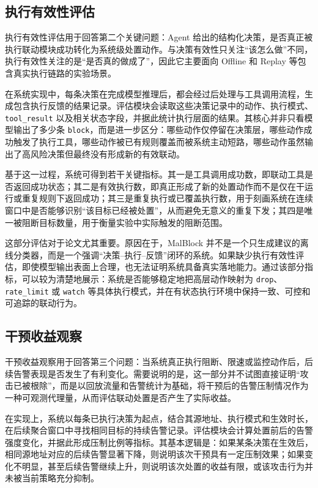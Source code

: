 \subsection{执行有效性评估}\label{subsec:evaluation_execution}

执行有效性评估用于回答第二个关键问题：Agent 给出的结构化决策，是否真正被执行联动模块成功转化为系统级处置动作。与决策有效性只关注``该怎么做''不同，执行有效性关注的是``是否真的做成了''，因此它主要面向 Offline 和 Replay 等包含真实执行链路的实验场景。

在系统实现中，每条决策在完成模型推理后，都会经过后处理与工具调用流程，生成包含执行反馈的结果记录。评估模块会读取这些决策记录中的动作、执行模式、\texttt{tool\_result} 以及相关状态字段，并据此统计执行层面的结果。其核心并非只看模型输出了多少条 \texttt{block}，而是进一步区分：哪些动作仅停留在决策层，哪些动作成功触发了执行工具，哪些动作被已有规则覆盖而被系统主动短路，哪些动作虽然输出了高风险决策但最终没有形成新的有效联动。

基于这一过程，系统可得到若干关键指标。其一是工具调用成功数，即联动工具是否返回成功状态；其二是有效执行数，即真正形成了新的处置动作而不是仅在干运行或重复规则下返回成功；其三是重复执行或已覆盖执行数，用于刻画系统在连续窗口中是否能够识别``该目标已经被处置''，从而避免无意义的重复下发；其四是唯一被阻断目标数量，用于衡量实验中实际触发的阻断范围。

这部分评估对于论文尤其重要。原因在于，MalBlock 并不是一个只生成建议的离线分类器，而是一个强调``决策--执行--反馈''闭环的系统。如果缺少执行有效性评估，即使模型输出表面上合理，也无法证明系统具备真实落地能力。通过该部分指标，可以较为清楚地展示：系统是否能够稳定地把高层动作映射为 \texttt{drop}、\texttt{rate\_limit} 或 \texttt{watch} 等具体执行模式，并在有状态执行环境中保持一致、可控和可追踪的联动行为。

\subsection{干预收益观察}\label{subsec:evaluation_effect}

干预收益观察用于回答第三个问题：当系统真正执行阻断、限速或监控动作后，后续告警表现是否发生了有利变化。需要说明的是，这一部分并不试图直接证明``攻击已被根除''，而是以回放流量和告警统计为基础，将干预后的告警压制情况作为一种可观测代理量，从而评估联动处置是否产生了实际收益。

在实现上，系统以每条已执行决策为起点，结合其源地址、执行模式和生效时长，在后续聚合窗口中寻找相同目标的持续告警记录。评估模块会计算处置前后的告警强度变化，并据此形成压制比例等指标。其基本逻辑是：如果某条决策在生效后，相同源地址对应的后续告警显著下降，则说明该次干预具有一定压制效果；如果变化不明显，甚至后续告警继续上升，则说明该次处置的收益有限，或该攻击行为并未被当前策略充分抑制。

